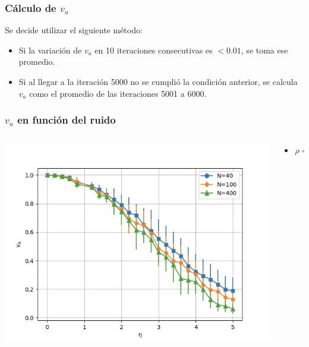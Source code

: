 \begin{frame}
\frametitle{Cálculo de \(v_a\)}
Se decide utilizar el siguiente método:
 \begin{itemize}
        \item Si la variación de \(v_a\) en 10 iteraciones consecutivas es \(< 0.01\), se toma ese promedio.
        \item Si al llegar a la iteración 5000 no se cumplió la condición anterior, se calcula \(v_a\) como el promedio de las iteraciones 5001 a 6000.   
        \end{itemize}
\end{frame}
\begin{frame}
\frametitle{\(v_a\) en función del ruido}
\begin{columns}
    \begin{column}{0.6\textwidth}
      \begin{center}
        \includegraphics[width=\textwidth]{images/va-vs-ruido.jpeg} %
      \end{center}
    \end{column}
    \begin{column}{0.4\textwidth}
                \footnotesize
\begin{center}
            \begin{itemize}
        \item \(\rho = 4\)
        \end{itemize}
\end{center}
    \end{column}
\end{columns}
\end{frame}
